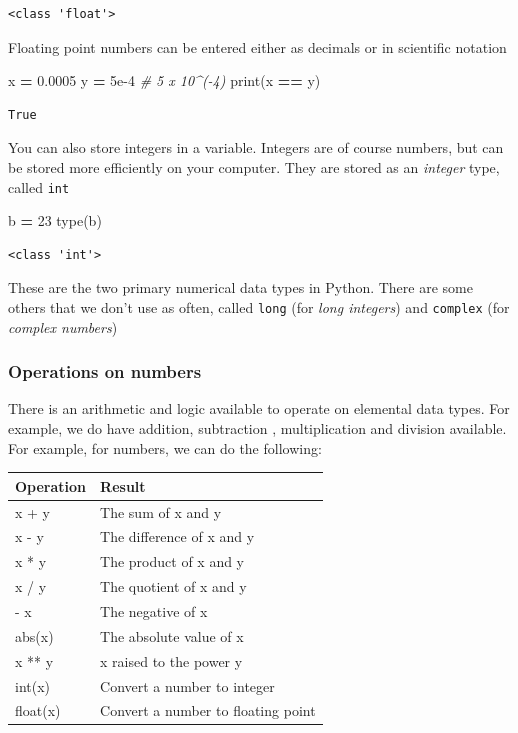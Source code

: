 \documentclass[
  letterpaper,
]{scrbook}
\newenvironment{Shaded}{\begin{snugshade}}{\end{snugshade}}
\newcommand{\BuiltInTok}[1]{#1}
\newcommand{\CommentTok}[1]{\textcolor[rgb]{0.56,0.35,0.01}{\textit{#1}}}
\newcommand{\DecValTok}[1]{\textcolor[rgb]{0.00,0.00,0.81}{#1}}
\newcommand{\FloatTok}[1]{\textcolor[rgb]{0.00,0.00,0.81}{#1}}
\newcommand{\NormalTok}[1]{#1}
\newcommand{\OperatorTok}[1]{\textcolor[rgb]{0.81,0.36,0.00}{\textbf{#1}}}
\begin{document}
\begin{verbatim}
<class 'float'>
\end{verbatim}

Floating point numbers can be entered either as decimals or in scientific notation

\begin{Shaded}
\begin{Highlighting}[]
\NormalTok{x }\OperatorTok{=} \FloatTok{0.0005}
\NormalTok{y }\OperatorTok{=} \FloatTok{5e-4} \CommentTok{# 5 x 10^(-4)}
\BuiltInTok{print}\NormalTok{(x }\OperatorTok{==}\NormalTok{ y)}
\end{Highlighting}
\end{Shaded}

\begin{verbatim}
True
\end{verbatim}

You can also store integers in a variable. Integers are of course numbers, but can be stored more efficiently on your computer. They are stored as an \emph{integer} type, called \texttt{int}

\begin{Shaded}
\begin{Highlighting}[]
\NormalTok{b }\OperatorTok{=} \DecValTok{23}
\BuiltInTok{type}\NormalTok{(b)}
\end{Highlighting}
\end{Shaded}

\begin{verbatim}
<class 'int'>
\end{verbatim}

These are the two primary numerical data types in Python. There are some others that we don't use as often, called \texttt{long} (for \emph{long integers}) and \texttt{complex} (for \emph{complex numbers})

\hypertarget{operations-on-numbers}{%
\subsubsection{Operations on numbers}\label{operations-on-numbers}}

There is an arithmetic and logic available to operate on elemental data types. For example, we do have addition, subtraction , multiplication and division available. For example, for numbers, we can do the following:

\begin{longtable}[]{@{}ll@{}}
\toprule
Operation & Result\tabularnewline
\midrule
\endhead
x + y & The sum of x and y\tabularnewline
x - y & The difference of x and y\tabularnewline
x * y & The product of x and y\tabularnewline
x / y & The quotient of x and y\tabularnewline
- x & The negative of x\tabularnewline
abs(x) & The absolute value of x\tabularnewline
x ** y & x raised to the power y\tabularnewline
int(x) & Convert a number to integer\tabularnewline
float(x) & Convert a number to floating point\tabularnewline
\bottomrule
\end{longtable}
\end{document}
